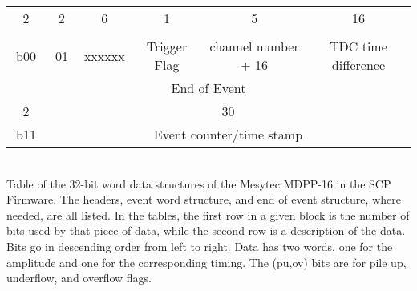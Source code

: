 \begin{landscape}
\begin{table}[]
\begin{tabular}{c|c|c|c|c|c|c|c|c|c|c|c|c|c|c|c|c|c|c|c|c|c|c|c|c|c|c|c|c|c|c|c}
        \hline
        \multicolumn{2}{c|}{2} & \multicolumn{2}{|c|}{2} & \multicolumn{6}{|c|}{6} & 1 & \multicolumn{5}{|c|}{5} & \multicolumn{16}{|c}{16}\\
        \addlinespace[-2ex]
        \multicolumn{2}{c|}{data-sig} & \multicolumn{2}{|c|}{} & \multicolumn{6}{|c|}{} &  & \multicolumn{5}{|c|}{} & \multicolumn{16}{|c}{}\\
        \hline
        \multicolumn{2}{c|}{b00} & \multicolumn{2}{|c|}{01} & \multicolumn{6}{|c|}{xxxxxx} & Trigger Flag & \multicolumn{5}{|c|}{channel number + 16} & \multicolumn{16}{|c}{TDC time difference}\\
        \midrule
        \multicolumn{32}{c}{End of Event} \\
        \hline
        \multicolumn{2}{c|}{2} & \multicolumn{30}{|c}{30}\\
        \hline
        \multicolumn{2}{c|}{b11} & \multicolumn{30}{|c}{Event counter/time stamp}\\
        \bottomrule
    \end{tabular}
    \\[2pt]
    \footnotesize
    Table of the 32-bit word data structures of the Mesytec MDPP-16 in the SCP Firmware. The headers, event word structure, and end of event structure, where needed, are all listed. In the tables, the first row in a given block is the number of bits used by that piece of data, while the second row is a description of the data. Bits go in descending order from left to right. Data has two words, one for the amplitude and one for the corresponding timing. The (pu,ov) bits are for pile up, underflow, and overflow flags.
\end{table}
\end{landscape}